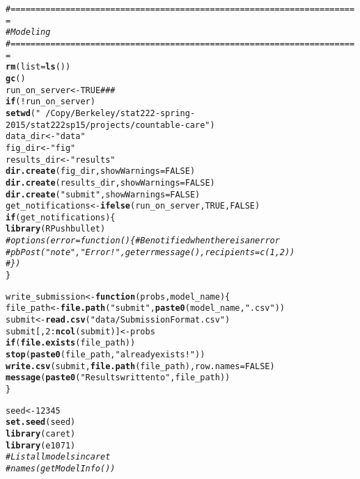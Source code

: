 \documentclass{article}\usepackage[]{graphicx}\usepackage[]{color}
\makeatletter
\newcommand{\hlnum}[1]{\textcolor[rgb]{0.686,0.059,0.569}{#1}}%
\newcommand{\hlstr}[1]{\textcolor[rgb]{0.192,0.494,0.8}{#1}}%
\newcommand{\hlcom}[1]{\textcolor[rgb]{0.678,0.584,0.686}{\textit{#1}}}%
\newcommand{\hlopt}[1]{\textcolor[rgb]{0,0,0}{#1}}%
\newcommand{\hlstd}[1]{\textcolor[rgb]{0.345,0.345,0.345}{#1}}%
\newcommand{\hlkwa}[1]{\textcolor[rgb]{0.161,0.373,0.58}{\textbf{#1}}}%
\newcommand{\hlkwb}[1]{\textcolor[rgb]{0.69,0.353,0.396}{#1}}%
\newcommand{\hlkwc}[1]{\textcolor[rgb]{0.333,0.667,0.333}{#1}}%
\newcommand{\hlkwd}[1]{\textcolor[rgb]{0.737,0.353,0.396}{\textbf{#1}}}%
\newenvironment{kframe}{%
 \def\at@end@of@kframe{}%
 \ifinner\ifhmode%
  \def\at@end@of@kframe{\end{minipage}}%
  \begin{minipage}{\columnwidth}%
 \fi\fi%
 \def\FrameCommand##1{\hskip\@totalleftmargin \hskip-\fboxsep
 \colorbox{shadecolor}{##1}\hskip-\fboxsep
     \hskip-\linewidth \hskip-\@totalleftmargin \hskip\columnwidth}%
 \MakeFramed {\advance\hsize-\width
   \@totalleftmargin\z@ \linewidth\hsize
   \@setminipage}}%
 {\par\unskip\endMakeFramed%
 \at@end@of@kframe}
\newenvironment{knitrout}{}{} %
\makeatother
\begin{document}
\begin{knitrout}
\color{fgcolor}\begin{kframe}
\begin{alltt}
\hlcom{#======================================================================}
\hlcom{# Modeling}
\hlcom{#======================================================================}
\hlkwd{rm}\hlstd{(}\hlkwc{list} \hlstd{=} \hlkwd{ls}\hlstd{())}
\hlkwd{gc}\hlstd{()}
\hlstd{run_on_server} \hlkwb{<-} \hlnum{TRUE} \hlcom{###}
\hlkwa{if} \hlstd{(}\hlopt{!}\hlstd{run_on_server)}
  \hlkwd{setwd}\hlstd{(}\hlstr{"~/Copy/Berkeley/stat222-spring-2015/stat222sp15/projects/countable-care"}\hlstd{)}
\hlstd{data_dir} \hlkwb{<-} \hlstr{"data"}
\hlstd{fig_dir} \hlkwb{<-} \hlstr{"fig"}
\hlstd{results_dir} \hlkwb{<-} \hlstr{"results"}
\hlkwd{dir.create}\hlstd{(fig_dir,} \hlkwc{showWarnings} \hlstd{=} \hlnum{FALSE}\hlstd{)}
\hlkwd{dir.create}\hlstd{(results_dir,} \hlkwc{showWarnings} \hlstd{=} \hlnum{FALSE}\hlstd{)}
\hlkwd{dir.create}\hlstd{(}\hlstr{"submit"}\hlstd{,} \hlkwc{showWarnings} \hlstd{=} \hlnum{FALSE}\hlstd{)}
\hlstd{get_notifications} \hlkwb{<-} \hlkwd{ifelse}\hlstd{(run_on_server,} \hlnum{TRUE}\hlstd{,} \hlnum{FALSE}\hlstd{)}
\hlkwa{if} \hlstd{(get_notifications) \{}
  \hlkwd{library}\hlstd{(RPushbullet)}
  \hlcom{# options(error = function() \{ # Be notified when there is an error}
  \hlcom{#   pbPost("note", "Error!", geterrmessage(), recipients = c(1, 2))}
  \hlcom{# \})}
\hlstd{\}}

\hlstd{write_submission} \hlkwb{<-} \hlkwa{function}\hlstd{(}\hlkwc{probs}\hlstd{,} \hlkwc{model_name}\hlstd{) \{}
  \hlstd{file_path} \hlkwb{<-} \hlkwd{file.path}\hlstd{(}\hlstr{"submit"}\hlstd{,} \hlkwd{paste0}\hlstd{(model_name,} \hlstr{".csv"}\hlstd{))}
  \hlstd{submit} \hlkwb{<-} \hlkwd{read.csv}\hlstd{(}\hlstr{"data/SubmissionFormat.csv"}\hlstd{)}
  \hlstd{submit[,} \hlnum{2}\hlopt{:}\hlkwd{ncol}\hlstd{(submit)]} \hlkwb{<-} \hlstd{probs}
  \hlkwa{if} \hlstd{(}\hlkwd{file.exists}\hlstd{(file_path))}
    \hlkwd{stop}\hlstd{(}\hlkwd{paste0}\hlstd{(file_path,} \hlstr{" already exists!"}\hlstd{))}
  \hlkwd{write.csv}\hlstd{(submit,} \hlkwd{file.path}\hlstd{(file_path),} \hlkwc{row.names} \hlstd{=} \hlnum{FALSE}\hlstd{)}
  \hlkwd{message}\hlstd{(}\hlkwd{paste0}\hlstd{(}\hlstr{"Results written to "}\hlstd{, file_path))}
\hlstd{\}}

\hlstd{seed} \hlkwb{<-} \hlnum{12345}
\hlkwd{set.seed}\hlstd{(seed)}
\hlkwd{library}\hlstd{(caret)}
\hlkwd{library}\hlstd{(e1071)}
\hlcom{# List all models in caret}
\hlcom{# names(getModelInfo())}


\end{alltt}
\end{kframe}
\end{knitrout}
\end{document}
